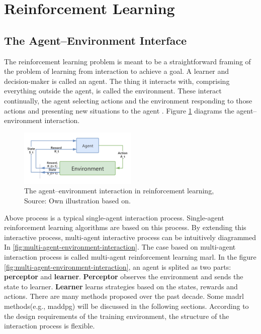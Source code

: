 \section{Reinforcement Learning}
\subsection{The Agent–Environment Interface}
The reinforcement learning problem is meant to be a straightforward framing of the problem of learning from interaction to achieve a goal. A learner and decision-maker is called an agent. The thing it interacts with, comprising everything outside the agent, is called the environment. These interact continually, the agent selecting actions and the environment responding to those actions and presenting new situations to the agent \parencite{Sutton2018}. Figure \ref{fig:agent-environment-interaction} diagrams the agent–environment interaction.

\begin{figure}[htbp]
\centering
\includegraphics[width=0.5\textwidth]{./images/agent-environment-interaction.png}
\caption{The agent–environment interaction in reinforcement learning, Source: Own illustration based
on\parencite{Sutton2018}.}
\label{fig:agent-environment-interaction}
\end{figure}

Above process is a typical single-agent interaction process. Single-agent reinforcement learning algorithms are based on this process. By extending this interactive process, multi-agent interactive process can be intuitively diagrammed In \ref{fig:multi-agent-environment-interaction}. The case based on multi-agent interaction process is called multi-agent reinforcement learning \gls{marl}. In the figure \ref{fig:multi-agent-environment-interaction}, an agent is splited as two parts: \textbf{perceptor} and \textbf{learner}. \textbf{Perceptor} observes the environment and sends the state to learner. \textbf{Learner} learns strategies based on the states, rewards and actions. There are many methods proposed over the past decade. Some \gls{madrl} methods(e.g., \gls{maddpg}) will be discussed in the following sections. According to the design requirements of the training environment, the structure of the interaction process is flexible.

